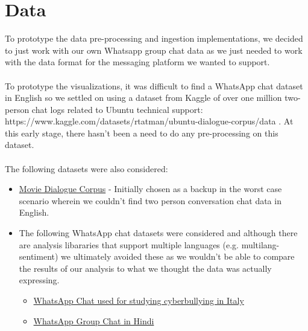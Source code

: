 \documentclass{article}\usepackage{graphicx}
\begin{document}
\section*{Data}
To prototype the data pre-processing and ingestion implementations, we decided to just work with our own Whatsapp group chat data as we just needed to work with the data format for the messaging platform we wanted to support. 
\\\\ To prototype the visualizations, it was difficult to find a WhatsApp chat dataset in English so we settled on using a dataset from Kaggle of over one million two-person chat logs related to Ubuntu technical support: https://www.kaggle.com/datasets/rtatman/ubuntu-dialogue-corpus/data . At this early stage, there hasn't been a need to do any pre-processing on this dataset. 
\\\\ The following datasets were also considered:
\begin{itemize}
    \item \href{https://github.com/dhfbk/WhatsApp-Dataset}{Movie Dialogue Corpus} - Initially chosen as a backup in the worst case scenario wherein we couldn't find two person conversation chat data in English. 
    \item The following WhatsApp chat datasets were considered and although there are analysis libararies that support multiple languages (e.g. multilang-sentiment) we ultimately avoided these as we wouldn't be able to compare the results of our analysis to what we thought the data was actually expressing. 
    \begin{itemize}
        \item \href{https://www.kaggle.com/datasets/Cornell-University/movie-dialog-corpus/data}{WhatsApp Chat used for studying cyberbullying in Italy}
        \item \href{https://www.kaggle.com/datasets/mmuhammetcavus/whatsapp-chat/data}{WhatsApp Group Chat in Hindi}
    \end{itemize}
\end{itemize}
\end{document}
